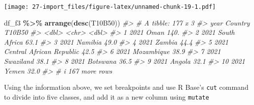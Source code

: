 \documentclass[
  xelatex, ja=standard]{bxjsbook}
\newenvironment{Shaded}{\begin{snugshade}}{\end{snugshade}}
\newcommand{\CommentTok}[1]{\textcolor[rgb]{0.56,0.35,0.01}{\textit{#1}}}
\newcommand{\FunctionTok}[1]{\textcolor[rgb]{0.13,0.29,0.53}{\textbf{#1}}}
\newcommand{\NormalTok}[1]{#1}
\newcommand{\SpecialCharTok}[1]{\textcolor[rgb]{0.81,0.36,0.00}{\textbf{#1}}}
\theoremstyle{definition}
\theoremstyle{definition}
\theoremstyle{definition}
\theoremstyle{definition}
\theoremstyle{remark}
\begin{document}
\texttt{[image: 27-import\_files/figure-latex/unnamed-chunk-19-1.pdf]}

\begin{Shaded}
\begin{Highlighting}[]
\NormalTok{df\_f3 }\SpecialCharTok{\%\textgreater{}\%} \FunctionTok{arrange}\NormalTok{(}\FunctionTok{desc}\NormalTok{(T10B50))}
\CommentTok{\#\textgreater{} \# A tibble: 177 x 3}
\CommentTok{\#\textgreater{}     year Country                  T10B50}
\CommentTok{\#\textgreater{}    \textless{}dbl\textgreater{} \textless{}chr\textgreater{}                     \textless{}dbl\textgreater{}}
\CommentTok{\#\textgreater{}  1  2021 Oman                      140. }
\CommentTok{\#\textgreater{}  2  2021 South Africa               63.1}
\CommentTok{\#\textgreater{}  3  2021 Namibia                    49.0}
\CommentTok{\#\textgreater{}  4  2021 Zambia                     44.4}
\CommentTok{\#\textgreater{}  5  2021 Central African Republic   42.5}
\CommentTok{\#\textgreater{}  6  2021 Mozambique                 38.9}
\CommentTok{\#\textgreater{}  7  2021 Swaziland                  38.1}
\CommentTok{\#\textgreater{}  8  2021 Botswana                   36.5}
\CommentTok{\#\textgreater{}  9  2021 Angola                     32.1}
\CommentTok{\#\textgreater{} 10  2021 Yemen                      32.0}
\CommentTok{\#\textgreater{} \# i 167 more rows}
\end{Highlighting}
\end{Shaded}

Using the information above, we set breakpoints and use R Base's \texttt{cut} command to divide into five classes, and add it as a new column using \texttt{mutate}
\end{document}
